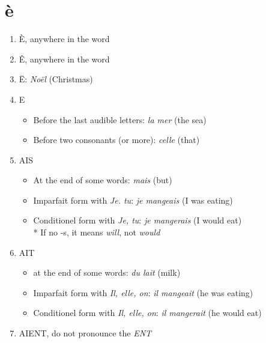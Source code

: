 \documentclass{book}
\begin{document}
    \section{è \textipa{[E]}}
        \begin{enumerate}
            \item È, anywhere in the word
            \item Ê, anywhere in the word
            \item Ë: \textit{Noël} \textipa{[nOEl]} (Christmas)
            \item E
                \begin{itemize}
                    \item Before the last audible letters: \textit{la mer} \textipa{[lamE]} (the sea)
                    \item Before two consonants (or more): \textit{celle} \textipa{[sEl]} (that)
                \end{itemize}
            \item AIS
                \begin{itemize}
                    \item At the end of some words: \textit{mais} \textipa{[mE]} (but)
                    \item Imparfait form with \textit{Je. tu}: \textit{je mangeais} \textipa{[Z@ m\~{a}ZE]} (I was eating)
                    \item Conditionel form with \textit{Je, tu}: \textit{je mangerais} \textipa{[Z@ m\~{a}gR@]} (I would eat) \\
                            * If no -s, it means \textit{will}, not \textit{would}
                \end{itemize}
            \item AIT
                \begin{itemize}
                    \item at the end of some words: \textit{du lait} \textipa{[dylE]} (milk)
                    \item Imparfait form with \textit{Il, elle, on}: \textit{il mangeait} \textipa{[il m\~{a}ZE]} (he was eating)
                    \item Conditionel form with \textit{Il, elle, on}: \textit{il mangerait} \textipa{[il m\~{a}gR@]} (he would eat)
                \end{itemize}
            \item AIENT, do not pronounce the \textit{ENT}
                \begin{itemize}

\end{itemize}
\end{enumerate}
\end{document}
